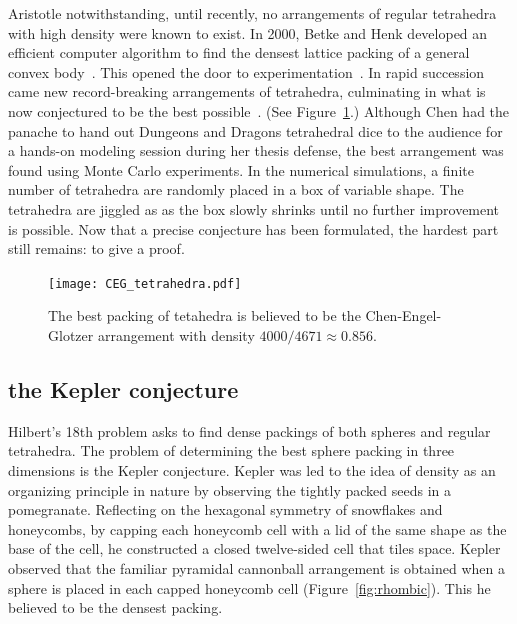 \documentclass{llncs}
\begin{document}
Aristotle notwithstanding, until recently, no arrangements of regular
tetrahedra with high density were known to exist.  In 2000, Betke and
Henk developed an efficient computer algorithm to find the densest
lattice packing of a general convex body~\cite{BH2000}.  This opened
the door to experimentation~\cite{Conway-2006}.  In rapid succession
came new record-breaking arrangements of tetrahedra, culminating in
what is now conjectured to be the best possible~\cite{Chen-2010}.
(See Figure~\ref{fig:CEG}.)  Although Chen had the panache to hand out
Dungeons and Dragons tetrahedral dice to the audience for a hands-on
modeling session during her thesis defense, the best arrangement was
found using Monte Carlo experiments.  In the numerical simulations, a
finite number of tetrahedra are randomly placed in a box of variable
shape.  The tetrahedra are jiggled as as the box slowly shrinks until
no further improvement is possible.  Now that a precise conjecture has
been formulated, the hardest part still remains: to give a proof.

\begin{figure}[h!]
  \centering
\texttt{[image: CEG\_tetrahedra.pdf]}
  \caption{The best packing of
tetahedra is believed to be the Chen-Engel-Glotzer arrangement with density
$4000/4671\approx 0.856$.}
\label{fig:CEG}
\end{figure}


\subsection{the Kepler conjecture}

% 


Hilbert's 18th problem asks to find dense packings of both spheres and
regular tetrahedra.  The problem of determining the best sphere
packing in three dimensions is the Kepler conjecture.  Kepler was led
to the idea of density as an organizing principle in nature by
observing the tightly packed seeds in a pomegranate.  Reflecting on
the hexagonal symmetry of snowflakes and honeycombs, by capping each
honeycomb cell with a lid of the same shape as the base of the cell,
he constructed a closed twelve-sided cell that tiles space.  Kepler
observed that the familiar pyramidal cannonball arrangement is
obtained when a sphere is placed in each capped honeycomb cell
(Figure~\ref{fig:rhombic}).  This he believed to be the densest
packing.
\end{document}
